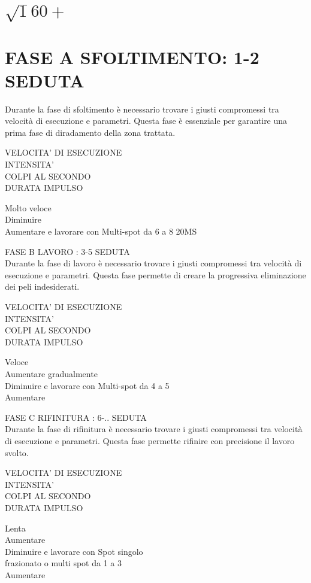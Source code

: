 \documentclass[10pt]{article}
\begin{document}
\section*{$\sqrt{1} 60+$ }
\section{FASE A SFOLTIMENTO: 1-2 SEDUTA}
Durante la fase di sfoltimento è necessario trovare i giusti compromessi tra velocità di esecuzione e parametri. Questa fase è essenziale per garantire una prima fase di diradamento della zona trattata.

VELOCITA' DI ESECUZIONE\\
INTENSITA'\\
COLPI AL SECONDO\\
DURATA IMPULSO

Molto veloce\\
Diminuire\\
Aumentare e lavorare con Multi-spot da 6 a 8 20MS

FASE B LAVORO : 3-5 SEDUTA\\
Durante la fase di lavoro è necessario trovare i giusti compromessi tra velocità di esecuzione e parametri. Questa fase permette di creare la progressiva eliminazione dei peli indesiderati.

VELOCITA' DI ESECUZIONE\\
INTENSITA'\\
COLPI AL SECONDO\\
DURATA IMPULSO

Veloce\\
Aumentare gradualmente\\
Diminuire e lavorare con Multi-spot da 4 a 5\\
Aumentare

FASE C RIFINITURA : 6-.. SEDUTA\\
Durante la fase di rifinitura è necessario trovare i giusti compromessi tra velocità di esecuzione e parametri. Questa fase permette rifinire con precisione il lavoro svolto.

VELOCITA' DI ESECUZIONE\\
INTENSITA'\\
COLPI AL SECONDO\\
DURATA IMPULSO

Lenta\\
Aumentare\\
Diminuire e lavorare con Spot singolo\\
frazionato o multi spot da 1 a 3\\
Aumentare
\end{document}
